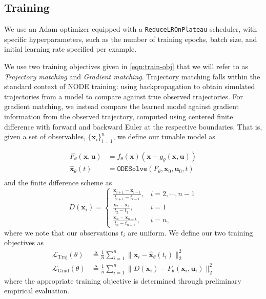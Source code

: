 \documentclass[11pt,twoside]{article}
\theoremstyle{plain}
\theoremstyle{definition}
\theoremstyle{remark}
\newcommand{\vect}[1]{\boldsymbol{#1}}
\begin{document}
\subsection*{Training}
 We use an Adam optimizer \cite{Kingma2014AdamMA} equipped with a \texttt{ReduceLROnPlateau} scheduler, with specific hyperparameters, such as the number of training epochs, batch size, and initial learning rate specified per example. 

 We use two training objectives given in \cref{eqn:train-obj} that we will refer to as \textit{Trajectory matching} and \textit{Gradient matching}. Trajectory matching falls within the standard context of NODE training: using backpropagation to obtain simulated trajectories from a model to compare against true observed trajectories. For gradient matching, we instead compare the learned model against gradient information from the observed trajectory, computed using centered finite difference with forward and backward Euler at the respective boundaries. That is, given a set of observables, \(\{\vect{x}_i\}_{i=1}^n\), we define our tunable model as 
 
\begin{equation}
\begin{split}
    F_{\theta}(\vect{x},\vect{u}) &= f_{\theta}(\vect{x})(\vect{x}-g_\theta(\vect{x},\vect{u}))\\
    \widehat{\vect{x}}_\theta(t) &=\texttt{ODESolve}(F_\theta, \vect{x}_0, \vect{u}_0, t)\\
    \end{split}
\end{equation}
and the finite difference scheme as 
\begin{equation}
D(\vect{x}_i) =
\begin{cases}
    \frac{\vect{x}_{i+1}-\vect{x}_{i-1}}{t_{i+1}-t_{i-1}}, & i = 2, \cdots, n-1\\
    \frac{\vect{x}_2-\vect{x}_1}{t_2 - t_1}, & i=1\\
    \frac{\vect{x}_n - \vect{x}_{n-1}}{t_{n}-t_{n-1}}, & i=n,
    
\end{cases}
\end{equation}
where we note that our observations \(t_i\) are uniform. We define our two training objectives as
\begin{equation}
\begin{split}
    \mathcal{L}_{\text{Traj}}(\theta) &\triangleq \frac{1}{n}\sum_{i=1}^n\|\vect{x}_i - \widehat{\vect{x}}_\theta(t_i)\|_2^2\\
    \mathcal{L}_{\text{Grad}}(\theta)&\triangleq \frac{1}{n}\sum_{i=1 }^n \|D(\vect{x}_i)-F_\theta(\vect{x}_i, \vect{u}_i)\|_2^2
\end{split}
\label{eqn:train-obj}
\end{equation}
where the appropriate training objective is determined through preliminary empirical evaluation.
\end{document}
